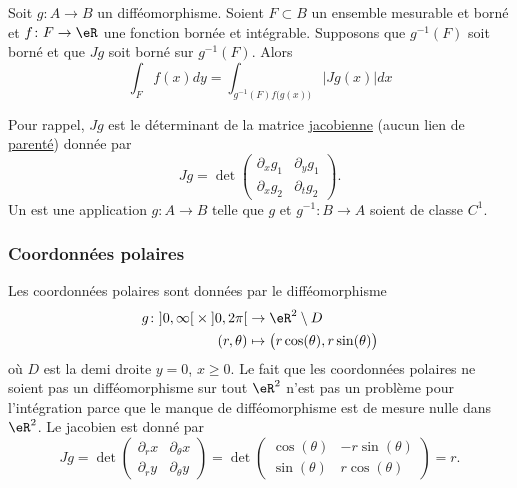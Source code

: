 \begin{theorem}
Soit $g\colon A\to B$ un difféomorphisme. Soient $F\subset B$ un ensemble mesurable et borné et $f\colon F\to \eR$ une fonction bornée et intégrable. Supposons que $g^{-1}(F)$ soit borné et que $Jg$ soit borné sur $g^{-1}(F)$. Alors
\begin{equation}
	\int_Ff(x)dy=\int_{g^{-1}(F)f\big( g(x) \big)}| Jg(x) |dx
\end{equation}
\end{theorem}
Pour rappel, $Jg$ est le déterminant de la matrice \href{http://fr.wikipedia.org/wiki/Matrice_jacobienne}{jacobienne} (aucun lien de \href{http://fr.wikipedia.org/wiki/Jacob}{parenté}) donnée par
\begin{equation}
	Jg=\det\begin{pmatrix}
	\partial_xg_1	&	\partial_yg_1	\\ 
	\partial_xg_2	&	\partial_tg_2	
\end{pmatrix}.
\end{equation}
Un  est une application $g\colon A\to B$ telle que $g$ et $g^{-1}\colon B\to A$ soient de classe $C^1$.

					\subsubsection{Coordonnées polaires}

Les coordonnées polaires sont données par le difféomorphisme
\begin{equation}
	\begin{aligned}
		g\colon \mathopen]0,\infty\mathclose[\times\mathopen]0,2\pi\mathclose[ &\to\eR^2\setminus D\\
		(r,\theta)&\mapsto \big( r\cos(\theta),r\sin(\theta) \big)
	\end{aligned}
\end{equation}
où $D$ est la demi droite $y=0$, $x\geq 0$. Le fait que les coordonnées polaires ne soient pas un difféomorphisme sur tout $\eR^2$ n'est pas un problème pour l'intégration parce que le manque de difféomorphisme est de mesure nulle dans $\eR^2$. Le jacobien est donné par
\begin{equation}
	Jg=\det\begin{pmatrix}
	\partial_rx	&	\partial_{\theta}x	\\ 
	\partial_ry	&	\partial_{\theta}y
\end{pmatrix}=\det\begin{pmatrix}
	\cos(\theta)	&	-r\sin(\theta)	\\ 
	\sin(\theta)	&	r\cos(\theta)	
\end{pmatrix}=r.
\end{equation}

